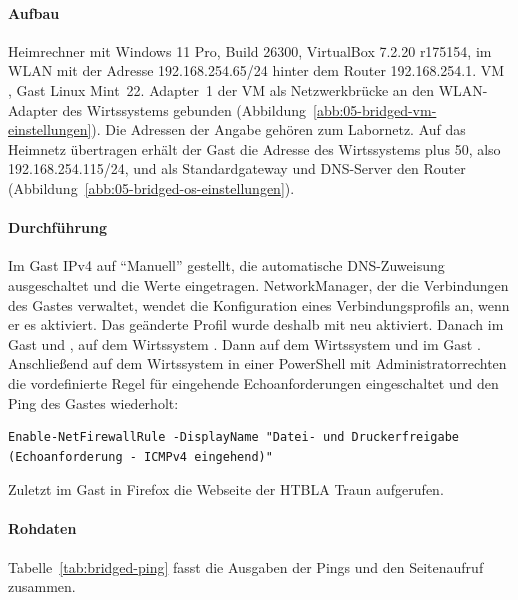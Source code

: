 \begin{messung}
\paragraph{Aufbau} Heimrechner mit Windows 11 Pro, Build 26300, VirtualBox 7.2.20 r175154, im WLAN mit der Adresse 192.168.254.65/24 hinter dem Router 192.168.254.1. VM , Gast Linux Mint~22. Adapter~1 der VM als Netzwerkbrücke an den WLAN-Adapter des Wirtssystems gebunden (Abbildung~\ref{abb:05-bridged-vm-einstellungen}). Die Adressen der Angabe gehören zum Labornetz. Auf das Heimnetz übertragen erhält der Gast die Adresse des Wirtssystems plus 50, also 192.168.254.115/24, und als Standardgateway und DNS-Server den Router (Abbildung~\ref{abb:05-bridged-os-einstellungen}).



\paragraph{Durchführung} Im Gast IPv4 auf \enquote{Manuell} gestellt, die automatische DNS-Zuweisung ausgeschaltet und die Werte eingetragen. NetworkManager, der die Verbindungen des Gastes verwaltet, wendet die Konfiguration eines Verbindungsprofils an, wenn er es aktiviert. Das geänderte Profil wurde deshalb mit  neu aktiviert. Danach im Gast  und , auf dem Wirtssystem . Dann auf dem Wirtssystem  und im Gast . Anschließend auf dem Wirtssystem in einer PowerShell mit Administratorrechten die vordefinierte Regel für eingehende Echoanforderungen eingeschaltet und den Ping des Gastes wiederholt:
\begin{lstlisting}
Enable-NetFirewallRule -DisplayName "Datei- und Druckerfreigabe (Echoanforderung - ICMPv4 eingehend)"
\end{lstlisting}
Zuletzt im Gast in Firefox die Webseite der HTBLA Traun aufgerufen.

\paragraph{Rohdaten} Tabelle~\ref{tab:bridged-ping} fasst die Ausgaben der Pings und den Seitenaufruf zusammen.


\end{messung}
